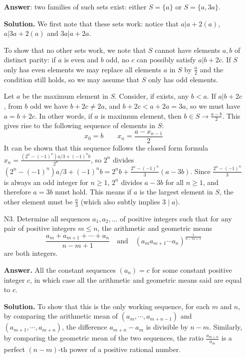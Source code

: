 \documentclass[11pt,a4paper]{article}
\begin{document}
\begin{enumerate}
    	\textbf{Answer}: two families of such sets exist: either 
    	$S = \{a\}$ or $S = \{a, 3a\}$. 
    	
    	\textbf{Solution.} We first note that these sets work: 
    	notice that $a | a + 2(a)$, $a | 3a + 2(a)$ and $3a | a + 2a$. 
    	
    	To show that no other sets work, we note that $S$ cannot have elements $a, b$ of distinct parity: 
    	if $a$ is even and $b$ odd, no $c$ can possibly satisfy $a | b + 2c$. 
    	If $S$ only has even elements we may replace all elements $a$ in $S$ by $\frac{a}{2}$ and the condition still holds, 
    	so we may assume that $S$ only has odd elements. 
    	
    	Let $a$ be the maximum element in $S$. 
    	Consider, if exists, any $b < a$. 
    	If $a | b + 2c$, from $b$ odd we have $b + 2c\neq 2a$, and $b + 2c < a + 2a = 3a$, 
    	so we must have $a = b + 2c$. 
    	In other words, if $a$ is maximum element, 
    	then $b\in S\to \frac{a - b}{2}$. 
    	This gives rise to the following sequence of elements in $S$: 
    	\[
    	x_0 = b\qquad x_n = \frac{a - x_{n - 1}}{2}
    	\]
    	It can be shown that this sequence follows the closed form formula 
    	$x_n = \frac{(2^{n}-(-1)^n)a/3 + (-1)^n b}{2^n}$, 
    	so $2^n$ divides $(2^{n}-(-1)^n)a/3 + (-1)^n b = 2^nb + \frac{2^{n}-(-1)^n}{3}(a - 3b)$. 
    	Since $\frac{2^{n}-(-1)^n}{3}$ is always an odd integer for $n\ge 1$, 
    	$2^n$ divides $a - 3b$ for all $n\ge 1$, 
    	and therefore $a = 3b$ must hold. 
    	This means if $a$ is the largest element in $S$, the other element must be $\frac{a}{3}$ (which also subtly implies 
    	$3\mid a$). 
    	
    	\item [N3.]
    	Determine all sequences $a_1, a_2, \dots$ of positive integers such that for any pair of positive integers $m\leqslant n$, the arithmetic and geometric means
    	\[ \frac{a_m + a_{m+1} + \cdots + a_n}{n-m+1}\quad\text{and}\quad (a_ma_{m+1}\cdots a_n)^{\frac{1}{n-m+1}}\]are both integers.
    	
    	\textbf{Answer.} 
    	All the constant sequences $(a_n)=c$ for some constant positive integer $c$, in which case all the arithmetic and geometric means said are equal to $c$. 
    	
    	\textbf{Solution.} 
    	To show that this is the only working sequence, 
    	for each $m$ and $n$, 
    	by comparing the arithmetic mean of $(a_m, \cdots, a_{m+n - 1})$ and $(a_{m + 1}, \cdots, a_{m+n})$, 
    	the difference $a_{m+n} - a_m$ is divisible by $n - m$. 
    	Similarly, by comparing the geometric mean of the two sequences, 
    	the ratio $\frac{a_{m+n}}{a_m}$ is a perfect $(n-m)$-th power of a positive rational number. 
    	

\end{enumerate}
\end{document}
